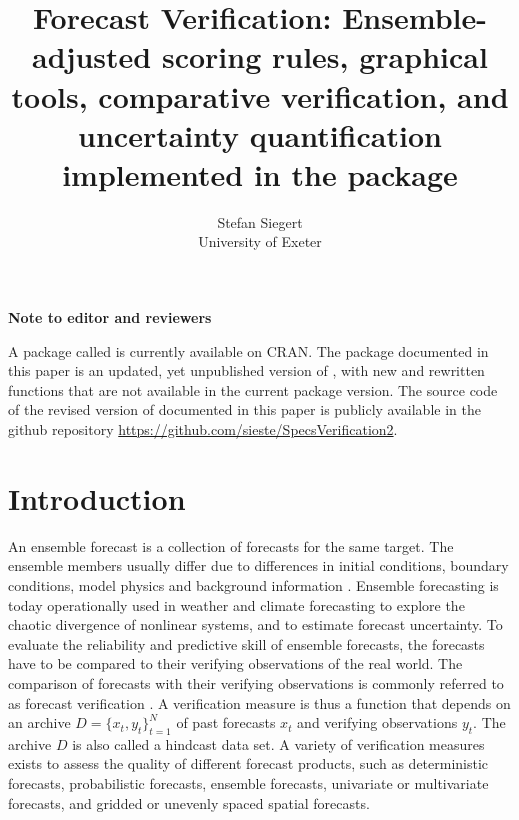 \documentclass[article]{jss}\usepackage[]{graphicx}\usepackage[]{color}
\author{Stefan Siegert\\University of Exeter}
\title{Forecast Verification: Ensemble-adjusted scoring rules, graphical tools, comparative verification, and uncertainty quantification implemented in the \proglang{R} package \pkg{SpecsVerification}}
\begin{document}

\textbf{Note to editor and reviewers}

A package called  is currently available on CRAN.
The package documented in this paper is an updated, yet unpublished version of , with new and rewritten functions that are not available in the current package version.
The source code of the revised version of  documented in this paper is publicly available in the github repository \url{https://github.com/sieste/SpecsVerification2}.


\section{Introduction}

An ensemble forecast is a collection of forecasts for the same target.
The ensemble members usually differ due to differences in initial conditions, boundary conditions, model physics and background information \citep{gneiting2005atmospheric, leutbecher2008ensemble}.
Ensemble forecasting is today operationally used in weather and climate forecasting to explore the chaotic divergence of nonlinear systems, and to estimate forecast uncertainty.
To evaluate the reliability and predictive skill of ensemble forecasts, the forecasts have to be compared to their verifying observations of the real world.
%
The comparison of forecasts with their verifying observations is commonly referred to as forecast verification \citep{jolliffe2012forecast}.
A verification measure is thus a function that depends on an archive $D=\{x_t, y_t\}_{t=1}^N$ of past forecasts $x_t$ and verifying observations $y_t$.
The archive $D$ is also called a hindcast data set.
A variety of verification measures exists to assess the quality of different forecast products, such as deterministic forecasts, probabilistic forecasts, ensemble forecasts, univariate or multivariate forecasts, and gridded or unevenly spaced spatial forecasts.
\end{document}
